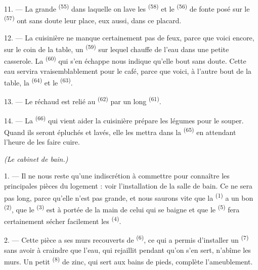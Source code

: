 \VUsaut{4.0mm}
\VUsaut{3.0mm}

11. --- La grande  \textsuperscript{(55)} dans laquelle on lave
les  \textsuperscript{(58)} et le 
\textsuperscript{(56)} de fonte posé sur le 
\textsuperscript{(57)} ont sans doute leur place, eux aussi, dans ce placard.

12. --- La cuisinière ne manque certainement pas de feux, parce que voici
encore, sur le coin de la table, un 
\textsuperscript{(59)} sur lequel chauffe de l'eau dans une petite casserole.
La  \textsuperscript{(60)} qui s'en échappe nous indique qu'elle
bout sans doute. Cette eau servira vraisemblablement pour le café, parce que
voici, à l'autre bout de la table, la  \textsuperscript{(64)}
et le  \textsuperscript{(63)}.

13. --- Le réchaud est relié au  \textsuperscript{(62)} par
un long  \textsuperscript{(61)}.

14. --- La  \textsuperscript{(66)} qui vient aider la
cuisinière prépare les légumes pour le souper. Quand ils seront épluchés et
lavés, elle les mettra dans la  \textsuperscript{(65)} en
attendant l'heure de les faire cuire.

\VUsaut{4.0mm}
{\centering\fontsize{10.2pt}{10.2pt}\selectfont{} \textit{(Le cabinet de bain.)}\par}
\VUsaut{3.0mm}

1. --- Il ne nous reste qu'une indiscrétion à commettre pour connaître les
principales pièces du logement : voir l'installation de la salle de bain. Ce ne
sera pas long, parce qu'elle n'est pas grande, et nous saurons vite que la
 \textsuperscript{(1)} a un bon 
\textsuperscript{(2)}, que le  \textsuperscript{(3)} est à
portée de la main de celui qui se baigne et que le 
\textsuperscript{(5)} fera certainement sécher facilement les
 \textsuperscript{(4)}.

2. --- Cette pièce a ses murs recouverts de 
\textsuperscript{(6)}, ce qui a permis d'installer un  \textsuperscript{(7)} sans avoir à craindre que l'eau, qui rejaillit
pendant qu'on s'en sert, n'abîme les murs. Un petit 
\textsuperscript{(8)} de zinc, qui sert aux bains de pieds, complète
l'ameublement.
\VUsaut{6.0mm}
\VUfilet{22mm}
